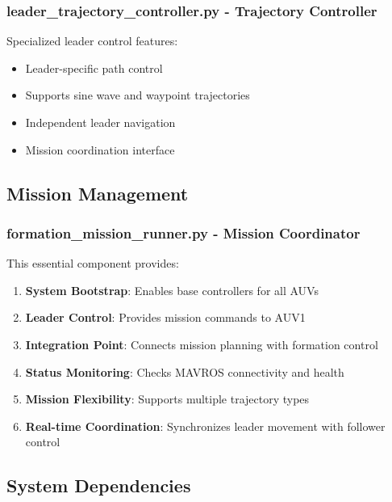 \documentclass[11pt,a4paper]{article}
\begin{document}
\subsubsection{leader\_trajectory\_controller.py - Trajectory Controller}

Specialized leader control features:
\begin{itemize}
    \item Leader-specific path control
    \item Supports sine wave and waypoint trajectories
    \item Independent leader navigation
    \item Mission coordination interface
\end{itemize}

\subsection{Mission Management}

\subsubsection{formation\_mission\_runner.py - Mission Coordinator}

This essential component provides:
\begin{enumerate}
    \item \textbf{System Bootstrap}: Enables base controllers for all AUVs
    \item \textbf{Leader Control}: Provides mission commands to AUV1
    \item \textbf{Integration Point}: Connects mission planning with formation control
    \item \textbf{Status Monitoring}: Checks MAVROS connectivity and health
    \item \textbf{Mission Flexibility}: Supports multiple trajectory types
    \item \textbf{Real-time Coordination}: Synchronizes leader movement with follower control
\end{enumerate}

\subsection{System Dependencies}
\end{document}
